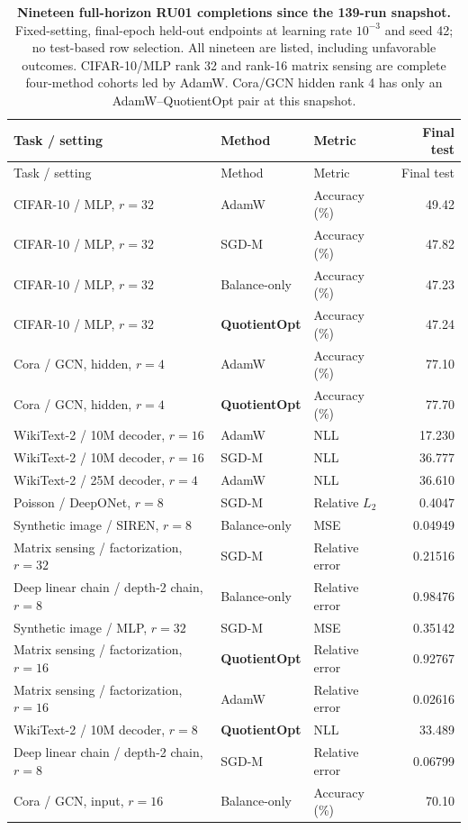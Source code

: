 \begin{longtable}{@{}p{.42\linewidth}p{.18\linewidth}p{.19\linewidth}r@{}}
\caption{\textbf{Nineteen full-horizon RU01 completions since the 139-run snapshot.} Fixed-setting, final-epoch held-out endpoints at learning rate $10^{-3}$ and seed 42; no test-based row selection. All nineteen are listed, including unfavorable outcomes. CIFAR-10/MLP rank 32 and rank-16 matrix sensing are complete four-method cohorts led by AdamW. Cora/GCN hidden rank 4 has only an AdamW--QuotientOpt pair at this snapshot.}\label{tab:ru01-latest}\\
\toprule Task / setting & Method & Metric & Final test \\ \midrule\endfirsthead
\toprule Task / setting & Method & Metric & Final test \\ \midrule\endhead
CIFAR-10 / MLP, $r=32$ & AdamW & Accuracy (\%) & 49.42\\
CIFAR-10 / MLP, $r=32$ & SGD-M & Accuracy (\%) & 47.82\\
CIFAR-10 / MLP, $r=32$ & Balance-only & Accuracy (\%) & 47.23\\
\rowcolor{oursbg}CIFAR-10 / MLP, $r=32$ & \cellcolor{oursbg}\textbf{QuotientOpt} & Accuracy (\%) & 47.24\\
Cora / GCN, hidden, $r=4$ & AdamW & Accuracy (\%) & 77.10\\
\rowcolor{oursbg}Cora / GCN, hidden, $r=4$ & \cellcolor{oursbg}\textbf{QuotientOpt} & Accuracy (\%) & 77.70\\
WikiText-2 / 10M decoder, $r=16$ & AdamW & NLL & 17.230\\
WikiText-2 / 10M decoder, $r=16$ & SGD-M & NLL & 36.777\\
WikiText-2 / 25M decoder, $r=4$ & AdamW & NLL & 36.610\\
Poisson / DeepONet, $r=8$ & SGD-M & Relative $L_2$ & 0.4047\\
Synthetic image / SIREN, $r=8$ & Balance-only & MSE & 0.04949\\
Matrix sensing / factorization, $r=32$ & SGD-M & Relative error & 0.21516\\
Deep linear chain / depth-2 chain, $r=8$ & Balance-only & Relative error & 0.98476\\
Synthetic image / MLP, $r=32$ & SGD-M & MSE & 0.35142\\
\rowcolor{oursbg}Matrix sensing / factorization, $r=16$ & \cellcolor{oursbg}\textbf{QuotientOpt} & Relative error & 0.92767\\
Matrix sensing / factorization, $r=16$ & AdamW & Relative error & 0.02616\\
\rowcolor{oursbg}WikiText-2 / 10M decoder, $r=8$ & \cellcolor{oursbg}\textbf{QuotientOpt} & NLL & 33.489\\
Deep linear chain / depth-2 chain, $r=8$ & SGD-M & Relative error & 0.06799\\
Cora / GCN, input, $r=16$ & Balance-only & Accuracy (\%) & 70.10\\
\bottomrule
\end{longtable}
